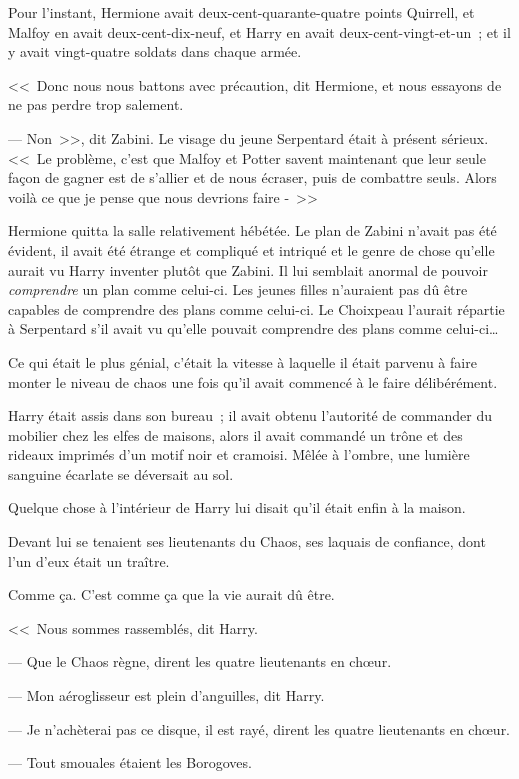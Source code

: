 Pour l'instant, Hermione avait deux-cent-quarante-quatre points Quirrell, et Malfoy en avait deux-cent-dix-neuf, et Harry en avait deux-cent-vingt-et-un~; et il y avait vingt-quatre soldats dans chaque armée.

<<~Donc nous nous battons avec précaution, dit Hermione, et nous essayons de ne pas perdre trop salement.

--- Non~>>, dit Zabini. Le visage du jeune Serpentard était à présent sérieux. <<~Le problème, c'est que Malfoy et Potter savent maintenant que leur seule façon de gagner est de s'allier et de nous écraser, puis de combattre seuls. Alors voilà ce que je pense que nous devrions faire -~>>

Hermione quitta la salle relativement hébétée. Le plan de Zabini n'avait pas été évident, il avait été étrange et compliqué et intriqué et le genre de chose qu'elle aurait vu Harry inventer plutôt que Zabini. Il lui semblait anormal de pouvoir \emph{comprendre} un plan comme celui-ci. Les jeunes filles n'auraient pas dû être capables de comprendre des plans comme celui-ci. Le Choixpeau l'aurait répartie à Serpentard s'il avait vu qu'elle pouvait comprendre des plans comme celui-ci…

\later

Ce qui était le plus génial, c'était la vitesse à laquelle il était parvenu à faire monter le niveau de chaos une fois qu'il avait commencé à le faire délibérément.

Harry était assis dans son bureau~; il avait obtenu l'autorité de commander du mobilier chez les elfes de maisons, alors il avait commandé un trône et des rideaux imprimés d'un motif noir et cramoisi. Mêlée à l'ombre, une lumière sanguine écarlate se déversait au sol.

Quelque chose à l'intérieur de Harry lui disait qu'il était enfin à la maison.

Devant lui se tenaient ses lieutenants du Chaos, ses laquais de confiance, dont l'un d'eux était un traître.

Comme ça. C'est comme ça que la vie aurait dû être.

<<~Nous sommes rassemblés, dit Harry.

--- Que le Chaos règne, dirent les quatre lieutenants en chœur.

--- Mon aéroglisseur est plein d'anguilles, dit Harry.

--- Je n'achèterai pas ce disque, il est rayé, dirent les quatre lieutenants en chœur.

--- Tout smouales étaient les Borogoves.

